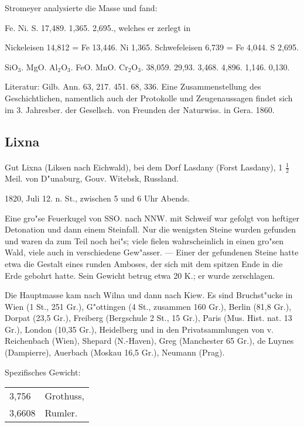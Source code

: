 \documentclass[a4paper, 11pt, oneside]{article}
\begin{document}
Stromeyer analysierte die Masse und fand:

Fe. Ni. S.  
17,489. 1,365. 2,695., welches er zerlegt in

Nickeleisen 14,812 = Fe 13,446. Ni 1,365.  
Schwefeleisen 6,739 = Fe 4,044. S 2,695.

SiO$_{3}$. MgO. Al$_{2}$O$_{3}$. FeO. MnO. Cr$_{2}$O$_{3}$.  
38,059. 29,93. 3,468. 4,896. 1,146. 0,130.

Literatur: Gilb. Ann. 63, 217. 451. 68, 336. Eine Zusammenstellung des Geschichtlichen, namentlich auch der Protokolle und Zeugenaussagen findet sich im 3. Jahresber. der Gesellsch. von Freunden der Naturwiss. in Gera. 1860.

\subsection{Lixna}
\normalsize
\paragraph{}
Gut Lixna (Liksen nach Eichwald), bei dem Dorf Lasdany (Forst Lasdany), 1 $\frac{1}{2}$ Meil. von D"unaburg, Gouv. Witebsk, Russland.

1820, Juli 12. n. St., zwischen 5 und 6 Uhr Abends.

Eine gro"se Feuerkugel von SSO. nach NNW. mit Schweif war gefolgt von heftiger Detonation und dann einem Steinfall. Nur die wenigsten Steine wurden gefunden und waren da zum Teil noch hei"s; viele fielen wahrscheinlich in einen gro"sen Wald, viele auch in verschiedene Gew"asser. --- Einer der gefundenen Steine hatte etwa die Gestalt eines runden Amboses, der sich mit dem spitzen Ende in die Erde gebohrt hatte. Sein Gewicht betrug etwa 20 K.; er wurde zerschlagen.

Die Hauptmasse kam nach Wilna und dann nach Kiew. Es sind Bruchst"ucke in Wien (1 St., 251 Gr.), G"ottingen (4 St., zusammen 160 Gr.), Berlin (81,8 Gr.), Dorpat (23,5 Gr.), Freiberg (Bergschule 2 St., 15 Gr.), Paris (Mus. Hist. nat. 13 Gr.), London (10,35 Gr.), Heidelberg und in den Privatsammlungen von v. Reichenbach (Wien), Shepard (N.-Haven), Greg (Manchester 65 Gr.), de Luynes (Dampierre), Auerbach (Moskau 16,5 Gr.), Neumann (Prag).

Spezifisches Gewicht:
\begin{table}[!ht]
    \centering
    \begin{tabular}{l l}
        3,756 & Grothuss,\\
        3,6608 & Rumler.
    \end{tabular}
\end{table}
\end{document}
